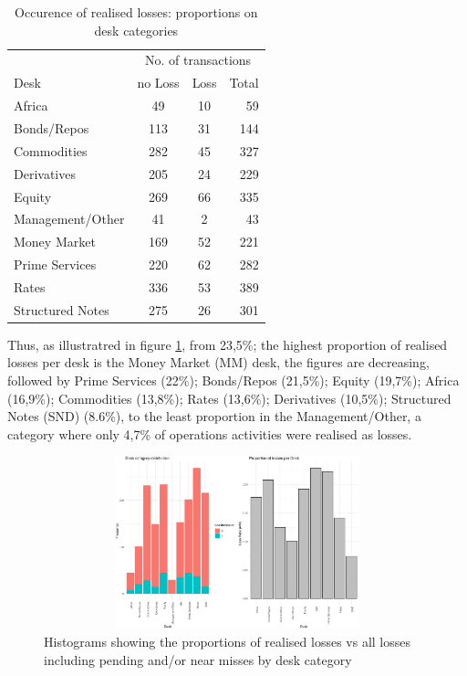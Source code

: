 \documentclass{DissertateUSU}
\begin{document}
\begin{table}[ht]
\centering
\caption{Occurence of realised losses: proportions on desk categories}
\begin{tabular}{lccr}
\toprule
  & \multicolumn{3}{c}{No. of transactions} \\
Desk   & no Loss   & Loss & Total\\ 
\midrule
  Africa            &  49 & 10 &  59 \\
  Bonds/Repos       & 113 & 31 & 144 \\
  Commodities       & 282 & 45 & 327 \\
  Derivatives       & 205 & 24 & 229 \\
  Equity            & 269 & 66 & 335 \\
  Management/Other  &  41 &  2 &  43 \\
  Money Market      & 169 & 52 & 221 \\
  Prime Services    & 220 & 62 & 282 \\
  Rates             & 336 & 53 & 389 \\
  Structured Notes  & 275 & 26 & 301 \\
 \bottomrule
\end{tabular}\label{tab_Desk_Prop}
\end{table}

Thus, as illustratred in figure \ref{Desk_Proportions}, from 23,5\%; the
highest proportion of realised losses per desk is the Money Market (MM)
desk, the figures are decreasing, followed by Prime Services (22\%);
Bonds/Repos (21,5\%); Equity (19,7\%); Africa (16,9\%); Commodities
(13,8\%); Rates (13,6\%); Derivatives (10,5\%); Structured Notes (SND)
(8.6\%), to the least proportion in the Management/Other, a category
where only 4,7\% of operations activities were realised as losses.

\singlespacing

\doublespacing

\begin{figure}
\centering
\includegraphics[width=15cm,height=5cm]{Exploratory_Desk_Proportions.eps}
\caption[Desk category by realised losses]{Histograms showing the proportions of realised losses vs all losses including pending and/or near misses by desk category}
\label{Desk_Proportions}
\end{figure}
\end{document}
